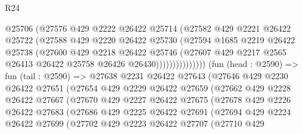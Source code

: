 \begin{lexlean}{R24}
\begin{coremodule}
                          @25706
                          (@27576
                            @429
                            @2222
                            @26422
                            @25714
                            (@27582
                              @429
                              @2221
                              @26422
                              @25722
                              (@27588
                                @429
                                @2220
                                @26422
                                @25730
                                (@27594
                                  @1685
                                  @2219
                                  @26422
                                  @25738
                                  (@27600
                                    @429
                                    @2218
                                    @26422
                                    @25746
                                    (@27607
                                      @429
                                      @2217
                                      @2565
                                      @26413
                                      @26422
                                      @25758
                                      @26426
                                      @26430)))))))))))))))
        (fun (head : @2590) =>
        fun (tail : @2590) =>
        @27638
          @2231
          @26422
          @27643
          (@27646
            @429
            @2230
            @26422
            @27651
            (@27654
              @429
              @2229
              @26422
              @27659
              (@27662
                @429
                @2228
                @26422
                @27667
                (@27670
                  @429
                  @2227
                  @26422
                  @27675
                  (@27678
                    @429
                    @2226
                    @26422
                    @27683
                    (@27686
                      @429
                      @2225
                      @26422
                      @27691
                      (@27694
                        @429
                        @2224
                        @26422
                        @27699
                        (@27702
                          @429
                          @2223
                          @26422
                          @27707
                          (@27710
                            @429

\end{coremodule}
\end{lexlean}
